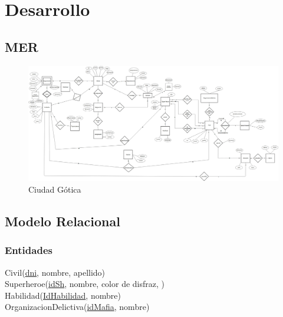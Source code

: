 \section{Desarrollo}

\subsection{MER} 

\begin{figure}[ht]
  \centering
  \includegraphics[scale=0.20]{MER/CiudadGotica.jpg}
  \caption{Ciudad Gótica}
  \label{fig:cg}
\end{figure}

\subsection{Modelo Relacional}\label{modelo-relacional}

\subsubsection{Entidades}\label{entidades}

Civil(\uline{dni}, nombre, apellido)\\

Superheroe(\uline{idSh}, nombre, color de disfraz, )\\

Habilidad(\uline{IdHabilidad}, nombre)\\

OrganizacionDelictiva(\uline{idMafia}, nombre)\\

